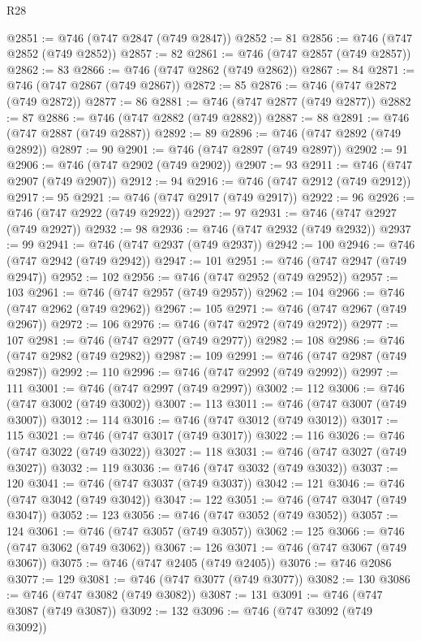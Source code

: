 \begin{lexlean}{R28}
\begin{coremodule}
@2851 := @746 (@747 @2847 (@749 @2847))
@2852 := 81
@2856 := @746 (@747 @2852 (@749 @2852))
@2857 := 82
@2861 := @746 (@747 @2857 (@749 @2857))
@2862 := 83
@2866 := @746 (@747 @2862 (@749 @2862))
@2867 := 84
@2871 := @746 (@747 @2867 (@749 @2867))
@2872 := 85
@2876 := @746 (@747 @2872 (@749 @2872))
@2877 := 86
@2881 := @746 (@747 @2877 (@749 @2877))
@2882 := 87
@2886 := @746 (@747 @2882 (@749 @2882))
@2887 := 88
@2891 := @746 (@747 @2887 (@749 @2887))
@2892 := 89
@2896 := @746 (@747 @2892 (@749 @2892))
@2897 := 90
@2901 := @746 (@747 @2897 (@749 @2897))
@2902 := 91
@2906 := @746 (@747 @2902 (@749 @2902))
@2907 := 93
@2911 := @746 (@747 @2907 (@749 @2907))
@2912 := 94
@2916 := @746 (@747 @2912 (@749 @2912))
@2917 := 95
@2921 := @746 (@747 @2917 (@749 @2917))
@2922 := 96
@2926 := @746 (@747 @2922 (@749 @2922))
@2927 := 97
@2931 := @746 (@747 @2927 (@749 @2927))
@2932 := 98
@2936 := @746 (@747 @2932 (@749 @2932))
@2937 := 99
@2941 := @746 (@747 @2937 (@749 @2937))
@2942 := 100
@2946 := @746 (@747 @2942 (@749 @2942))
@2947 := 101
@2951 := @746 (@747 @2947 (@749 @2947))
@2952 := 102
@2956 := @746 (@747 @2952 (@749 @2952))
@2957 := 103
@2961 := @746 (@747 @2957 (@749 @2957))
@2962 := 104
@2966 := @746 (@747 @2962 (@749 @2962))
@2967 := 105
@2971 := @746 (@747 @2967 (@749 @2967))
@2972 := 106
@2976 := @746 (@747 @2972 (@749 @2972))
@2977 := 107
@2981 := @746 (@747 @2977 (@749 @2977))
@2982 := 108
@2986 := @746 (@747 @2982 (@749 @2982))
@2987 := 109
@2991 := @746 (@747 @2987 (@749 @2987))
@2992 := 110
@2996 := @746 (@747 @2992 (@749 @2992))
@2997 := 111
@3001 := @746 (@747 @2997 (@749 @2997))
@3002 := 112
@3006 := @746 (@747 @3002 (@749 @3002))
@3007 := 113
@3011 := @746 (@747 @3007 (@749 @3007))
@3012 := 114
@3016 := @746 (@747 @3012 (@749 @3012))
@3017 := 115
@3021 := @746 (@747 @3017 (@749 @3017))
@3022 := 116
@3026 := @746 (@747 @3022 (@749 @3022))
@3027 := 118
@3031 := @746 (@747 @3027 (@749 @3027))
@3032 := 119
@3036 := @746 (@747 @3032 (@749 @3032))
@3037 := 120
@3041 := @746 (@747 @3037 (@749 @3037))
@3042 := 121
@3046 := @746 (@747 @3042 (@749 @3042))
@3047 := 122
@3051 := @746 (@747 @3047 (@749 @3047))
@3052 := 123
@3056 := @746 (@747 @3052 (@749 @3052))
@3057 := 124
@3061 := @746 (@747 @3057 (@749 @3057))
@3062 := 125
@3066 := @746 (@747 @3062 (@749 @3062))
@3067 := 126
@3071 := @746 (@747 @3067 (@749 @3067))
@3075 := @746 (@747 @2405 (@749 @2405))
@3076 := @746 @2086
@3077 := 129
@3081 := @746 (@747 @3077 (@749 @3077))
@3082 := 130
@3086 := @746 (@747 @3082 (@749 @3082))
@3087 := 131
@3091 := @746 (@747 @3087 (@749 @3087))
@3092 := 132
@3096 := @746 (@747 @3092 (@749 @3092))

\end{coremodule}
\end{lexlean}
